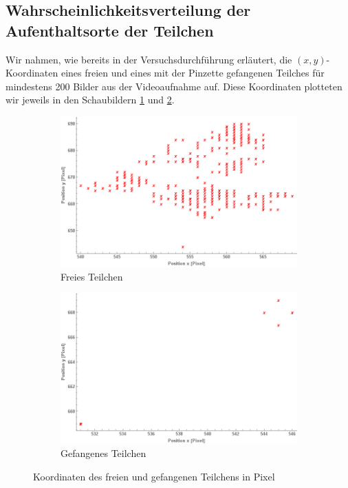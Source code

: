 \documentclass[a4paper,titlepage]{scrartcl}
\numberwithin{equation}{section}
\begin{document}
\subsection{Wahrscheinlichkeitsverteilung der Aufenthaltsorte der Teilchen}
Wir nahmen, wie bereits in der Versuchsdurchführung erläutert, die $(x,y)$-Koordinaten eines freien und eines mit der Pinzette gefangenen Teilches für mindestens 200 Bilder aus der Videoaufnahme auf. Diese Koordinaten plotteten wir jeweils in den Schaubildern \ref{fig:frei} und \ref{fig:fest}.
\begin{figure}[H]
\centering
\begin{subfigure}{.5\textwidth}
  \centering
  \includegraphics[width=.95\linewidth]{images/frei.png}
  \caption{Freies Teilchen}
  \label{fig:frei}
\end{subfigure}%
\begin{subfigure}{.5\textwidth}
  \centering
  \includegraphics[width=.95\linewidth]{images/fest.png}
  \caption{Gefangenes Teilchen}
  \label{fig:fest}
\end{subfigure}
\caption{Koordinaten des freien und gefangenen Teilchens in Pixel}
\label{fig:koordinaten}
\end{figure}
\end{document}
